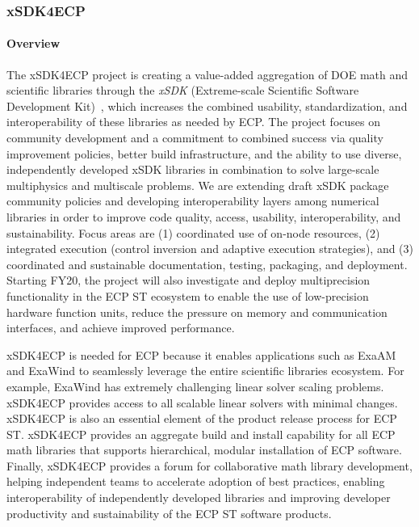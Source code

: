\subsubsection{ xSDK4ECP} 
\paragraph{Overview} The xSDK4ECP project is creating a value-added aggregation of DOE math and scientific libraries through the {\em xSDK} (Extreme-scale Scientific Software Development Kit)~\cite{xsdk:homepage}, which increases the combined usability, standardization, and interoperability of these libraries as needed by ECP. The project focuses on community development and a commitment to combined success via quality improvement policies, better build infrastructure, and the ability to use diverse, independently developed xSDK libraries in combination to solve large-scale multiphysics and multiscale problems.  We are extending draft xSDK package community policies and developing interoperability layers among numerical libraries in order to improve code quality, access, usability, interoperability, and sustainability. Focus areas are (1) coordinated use of on-node resources, (2) integrated execution (control inversion and adaptive execution strategies), and (3) coordinated and sustainable documentation, testing, packaging, and deployment. Starting FY20, the project will also investigate and deploy multiprecision functionality in the ECP ST ecosystem to enable the use of low-precision hardware function units, reduce the pressure on memory and communication interfaces, and achieve improved performance.

xSDK4ECP is needed for ECP because it enables applications such as ExaAM and ExaWind to seamlessly leverage the entire scientific libraries ecosystem.  For example, ExaWind has extremely challenging linear solver scaling problems.  xSDK4ECP provides access to all scalable linear solvers with minimal changes.  xSDK4ECP is also an essential element of the product release process for ECP ST.  xSDK4ECP provides an aggregate build and install capability for all ECP math libraries that supports hierarchical, modular installation of ECP software.  Finally, xSDK4ECP provides a forum for collaborative math library development, helping independent teams to accelerate adoption of best practices, enabling interoperability of independently developed libraries and improving developer productivity and sustainability of the ECP ST software products.


